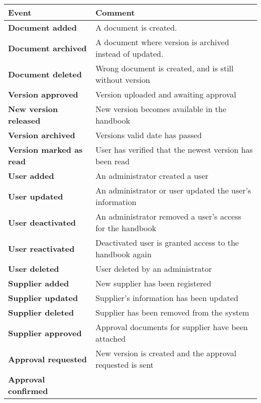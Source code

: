 \begin{table}[H]
	\begin{tabular}{m{} l}
		\hline
		Event & Comment\\
		\hline
		\textbf{Document added} & A document is created.\\
		\textbf{Document archived} & A document where version is archived instead of updated.\\
		\textbf{Document deleted} & Wrong document is created, and is still without version\\
		\textbf{Version approved}  & Version uploaded and awaiting approval\\
		\textbf{New version released} &  New version becomes available in the handbook\\
		\textbf{Version archived} & Versions valid date has passed\\
		\textbf{Version marked \newline as read} & User has verified that the newest version has been read\\
		\textbf{User added} & An administrator created a user\\
		\textbf{User updated} & An administrator or user updated the user's information\\
		\textbf{User deactivated} & An administrator removed a user's access for the handbook\\
		\textbf{User reactivated} & Deactivated user is granted access to the handbook again\\
		\textbf{User deleted} & User deleted by an administrator\\
		\textbf{Supplier added} & New supplier has been registered\\
		\textbf{Supplier updated} & Supplier's information has been updated\\
		\textbf{Supplier deleted} & Supplier has been removed from the system\\
		\textbf{Supplier approved} & Approval documents for supplier have been attached\\
		\textbf{Approval requested} & New version is created and the approval requested is sent\\
		\textbf{Approval confirmed}

\end{tabular}
\end{table}
